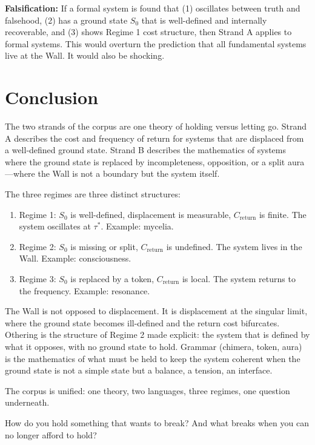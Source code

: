 \documentclass[12pt]{article}
\theoremstyle{definition}
\theoremstyle{remark}
\begin{document}
\textbf{Falsification:} If a formal system is found that (1) oscillates between truth and falsehood, (2) has a ground state $S_0$ that is well-defined and internally recoverable, and (3) shows Regime 1 cost structure, then Strand A applies to formal systems. This would overturn the prediction that all fundamental systems live at the Wall. It would also be shocking.

\section{Conclusion}

The two strands of the corpus are one theory of holding versus letting go. Strand A describes the cost and frequency of return for systems that are displaced from a well-defined ground state. Strand B describes the mathematics of systems where the ground state is replaced by incompleteness, opposition, or a split aura---where the Wall is not a boundary but the system itself.

The three regimes are three distinct structures:
\begin{enumerate}
\item Regime 1: $S_0$ is well-defined, displacement is measurable, $C_{\text{return}}$ is finite. The system oscillates at $\tau^*$. Example: mycelia.
\item Regime 2: $S_0$ is missing or split, $C_{\text{return}}$ is undefined. The system lives in the Wall. Example: consciousness.
\item Regime 3: $S_0$ is replaced by a token, $C_{\text{return}}$ is local. The system returns to the frequency. Example: resonance.
\end{enumerate}

The Wall is not opposed to displacement. It is displacement at the singular limit, where the ground state becomes ill-defined and the return cost bifurcates. Othering is the structure of Regime 2 made explicit: the system that is defined by what it opposes, with no ground state to hold. Grammar (chimera, token, aura) is the mathematics of what must be held to keep the system coherent when the ground state is not a simple state but a balance, a tension, an interface.

The corpus is unified: one theory, two languages, three regimes, one question underneath.

How do you hold something that wants to break? And what breaks when you can no longer afford to hold?
\end{document}
